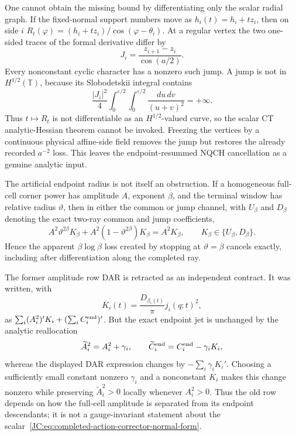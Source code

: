 \begin{contract}
\begin{remark}
\label{JC:rem:super-near-radial-Hhalf-obstruction}
One cannot obtain the missing bound by differentiating only the scalar
radial graph.  If the fixed-normal support numbers move as
$h_i(t)=h_i+tz_i$, then on side $i$
$R_t(\varphi)=(h_i+tz_i)/\cos(\varphi-\theta_i)$.  At a regular vertex
the two one-sided traces of the formal derivative differ by
\begin{equation}\label{JC:eq:super-near-radial-Hhalf-jump}
 J_i=\frac{z_{i+1}-z_i}{\cos(a/2)}.
\end{equation}
Every nonconstant cyclic character has a nonzero such jump.  A jump is
not in $H^{1/2}(\mathbb T)$, because its Slobodetskii integral contains
\[
 \frac{|J_i|^2}{4}
 \int_0^{\varepsilon/2}\!\int_0^{\varepsilon/2}
 \frac{du\,dv}{(u+v)^2}=+\infty.
\]
Thus $t\mapsto R_t$ is not differentiable as an $H^{1/2}$-valued curve,
so the scalar CT analytic-Hessian theorem cannot be invoked.  Freezing
the vertices by a continuous physical affine-side field removes the jump
but restores the already recorded $a^{-2}$ loss.  This leaves the
endpoint-resummed NQCH cancellation as a genuine analytic input.
\end{remark}

\begin{remark}
\label{JC:rem:super-near-completed-third-jet}
The artificial endpoint radius is not itself an obstruction.  If a
homogeneous full-cell corner power has amplitude $A$, exponent $\beta$, and
the terminal window has relative radius $\vartheta$, then in either the
common or jump channel, with $U_\beta$ and $D_\beta$ denoting the exact
two-ray common and jump coefficients,
\[
 A^2\vartheta^{2\beta}K_\beta
 +A^2(1-\vartheta^{2\beta})K_\beta=A^2K_\beta,
 \qquad K_\beta\in\{U_\beta,D_\beta\}.
\]
Hence the apparent $\beta\log\beta$ loss created by stopping at
$\vartheta=\beta$ cancels exactly, including after differentiation along
the completed ray.

The former amplitude row DAR is retracted as an independent contract.  It
was written, with
\[
 K_i(t)=\frac{D_{\beta_i(t)}}\pi j_i(q;t)^2,
\]
as $\sum_i(A_i^2)'K_i+(\sum_iC_i^{\rm end})'$.  But the exact endpoint
jet is unchanged by the analytic reallocation
\[
 \widetilde A_i^2=A_i^2+\gamma_i,
 \qquad
 \widetilde C_i^{\rm end}=C_i^{\rm end}-\gamma_iK_i,
\]
whereas the displayed DAR expression changes by
$-\sum_i\gamma_iK_i'$.  Choosing a sufficiently small constant nonzero
$\gamma_i$ and a nonconstant $K_i$ makes this change nonzero while
preserving $\widetilde A_i^2>0$ locally whenever $A_i^2>0$.  Thus the old
row depends on how the full-cell amplitude is
separated from its endpoint descendants; it is not a gauge-invariant
statement about the scalar~\eqref{JC:eq:completed-action-corrector-normal-form}.


\end{remark}
\end{contract}
